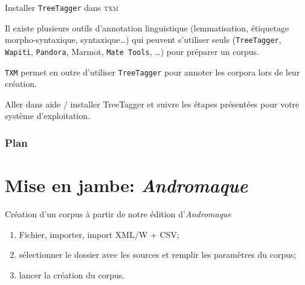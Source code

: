 \documentclass{beamer}
\begin{document}
\begin{frame}{Installer \texttt{TreeTagger} dans \textsc{txm}}
	
	Il existe plusieurs outils d'annotation linguistique (lemmatisation, étiquetage morpho-syntaxique,  syntaxique…) qui peuvent s'utiliser seuls (\texttt{TreeTagger}, \texttt{Wapiti}, \texttt{Pandora},  Marmot, \texttt{Mate Tools}, …) pour préparer un corpus.
	
	\texttt{TXM} permet en outre d'utiliser \texttt{TreeTagger} 
	pour annoter les corpora lors de leur création.
	
	\alert{Aller dans aide / installer TreeTagger et suivre les étapes présentées pour votre système d'exploitation.}
	
\end{frame}


\begin{frame} 
  \frametitle{Plan} 
  \tableofcontents
\end{frame}

\section{Mise en jambe: \textit{Andromaque}}

\begin{frame}{Création d'un corpus à partir de notre édition d'\textit{Andromaque}}

\begin{enumerate}
	\item Fichier, importer, import XML/W + CSV;
	\item sélectionner le dossier avec les sources et remplir les paramètres du corpus;
	\item lancer la création du corpus.
\end{enumerate}

\end{frame}
\end{document}

